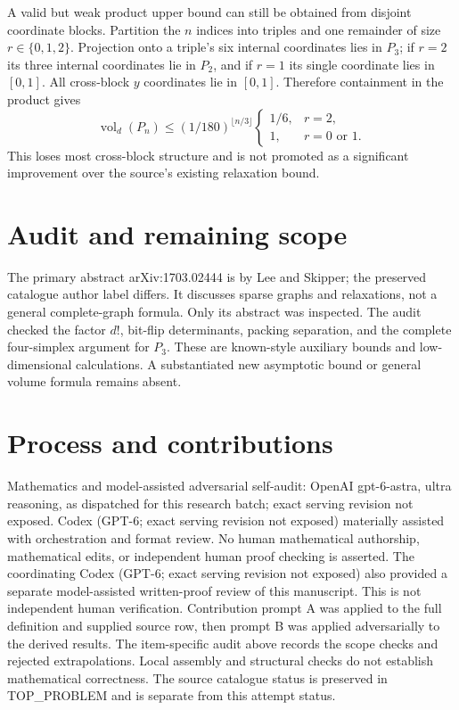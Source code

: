 \documentclass[11pt]{article}
\begin{document}
A valid but weak product upper bound can still be obtained from disjoint
coordinate blocks. Partition the $n$ indices into triples and one remainder
of size $r\in\{0,1,2\}$. Projection onto a triple's six internal coordinates
lies in $P_3$; if $r=2$ its three internal coordinates lie in $P_2$, and
if $r=1$ its single coordinate lies in $[0,1]$. All cross-block $y$ coordinates
lie in $[0,1]$. Therefore containment in the product gives
\[
\operatorname{vol}_d(P_n)\le(1/180)^{\lfloor n/3\rfloor}
\begin{cases}1/6,&r=2,\\1,&r=0\text{ or }1.\end{cases}
\]
This loses most cross-block structure and is not promoted as a significant
improvement over the source's existing relaxation bound.

\section{Audit and remaining scope}
The primary abstract arXiv:1703.02444 is by Lee and Skipper; the preserved
catalogue author label differs. It discusses sparse graphs and relaxations,
not a general complete-graph formula. Only its abstract was inspected.
The audit checked the factor $d!$, bit-flip determinants, packing separation,
and the complete four-simplex argument for $P_3$. These are known-style
auxiliary bounds and low-dimensional calculations. A substantiated new
asymptotic bound or general volume formula remains absent.

\section{Process and contributions}
Mathematics and model-assisted adversarial self-audit: OpenAI gpt-6-astra, ultra reasoning, as dispatched for this research batch; exact serving revision not exposed. Codex (GPT-6; exact serving revision not exposed) materially assisted with orchestration and format review. No human mathematical authorship, mathematical edits, or independent human proof checking is asserted.
The coordinating Codex (GPT-6; exact serving revision not exposed) also provided a separate model-assisted written-proof review of this manuscript. This is not independent human verification.
Contribution prompt A was applied to the full definition and supplied source row, then prompt B was applied adversarially to the derived results. The item-specific audit above records the scope checks and rejected extrapolations. Local assembly and structural checks do not establish mathematical correctness. The source catalogue status is preserved in TOP\_PROBLEM and is separate from this attempt status.
\end{document}
